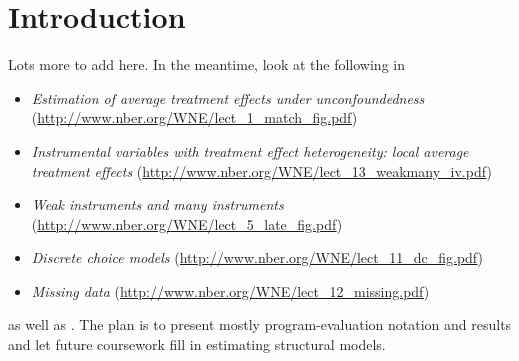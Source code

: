 

\chapter{Introduction}

Lots more to add here. In the meantime, look at the following in
\citet{IW07}

\begin{itemize}
\item \textit{Estimation of average treatment effects under
    unconfoundedness}
  (\url{http://www.nber.org/WNE/lect_1_match_fig.pdf})
\item \textit{Instrumental variables with treatment effect
    heterogeneity: local average treatment effects}
  (\url{http://www.nber.org/WNE/lect_13_weakmany_iv.pdf})
\item \textit{Weak instruments and many instruments}
  (\url{http://www.nber.org/WNE/lect_5_late_fig.pdf})
\item \textit{Discrete choice models}
  (\url{http://www.nber.org/WNE/lect_11_dc_fig.pdf})
\item \textit{Missing data}
  (\url{http://www.nber.org/WNE/lect_12_missing.pdf})
\end{itemize}
as well as \citet{IW09}. The plan is to present mostly
program-evaluation notation and results and let future coursework fill
in estimating structural models.

